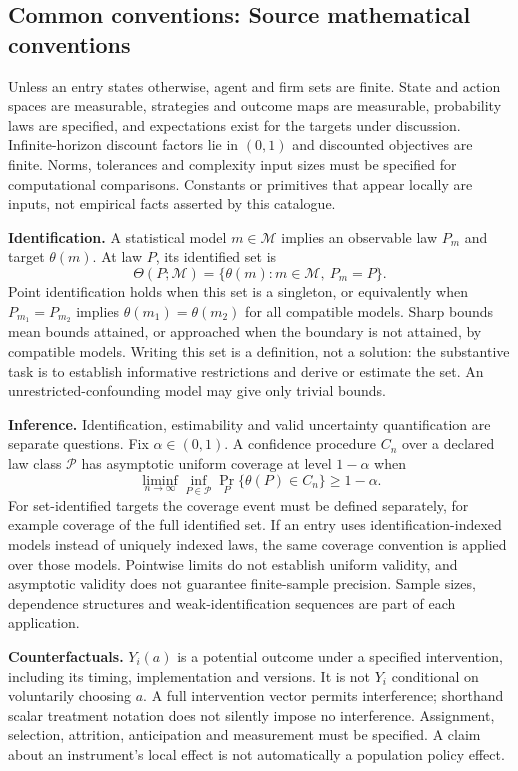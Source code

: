 \documentclass[11pt,a4paper]{article}
\begin{document}
\subsection*{Common conventions: Source mathematical conventions}

Unless an entry states otherwise, agent and firm sets are finite. State and action spaces are measurable, strategies and outcome maps are measurable, probability laws are specified, and expectations exist for the targets under discussion. Infinite-horizon discount factors lie in $(0,1)$ and discounted objectives are finite. Norms, tolerances and complexity input sizes must be specified for computational comparisons. Constants or primitives that appear locally are inputs, not empirical facts asserted by this catalogue.

\textbf{Identification.} A statistical model $m\in\mathcal M$ implies an observable law $P_m$ and target $\theta(m)$. At law $P$, its identified set is
\[
\Theta(P;\mathcal M)=\{\theta(m):m\in\mathcal M,\ P_m=P\}.
\]
Point identification holds when this set is a singleton, or equivalently when $P_{m_1}=P_{m_2}$ implies $\theta(m_1)=\theta(m_2)$ for all compatible models. Sharp bounds mean bounds attained, or approached when the boundary is not attained, by compatible models. Writing this set is a definition, not a solution: the substantive task is to establish informative restrictions and derive or estimate the set. An unrestricted-confounding model may give only trivial bounds.

\textbf{Inference.} Identification, estimability and valid uncertainty quantification are separate questions. Fix $\alpha\in(0,1)$. A confidence procedure $C_n$ over a declared law class $\mathcal P$ has asymptotic uniform coverage at level $1-\alpha$ when
\[
\liminf_{n\to\infty}\inf_{P\in\mathcal P}\Pr_P\{\theta(P)\in C_n\}\geq1-\alpha.
\]
For set-identified targets the coverage event must be defined separately, for example coverage of the full identified set. If an entry uses identification-indexed models instead of uniquely indexed laws, the same coverage convention is applied over those models. Pointwise limits do not establish uniform validity, and asymptotic validity does not guarantee finite-sample precision. Sample sizes, dependence structures and weak-identification sequences are part of each application.

\textbf{Counterfactuals.} $Y_i(a)$ is a potential outcome under a specified intervention, including its timing, implementation and versions. It is not $Y_i$ conditional on voluntarily choosing $a$. A full intervention vector permits interference; shorthand scalar treatment notation does not silently impose no interference. Assignment, selection, attrition, anticipation and measurement must be specified. A claim about an instrument's local effect is not automatically a population policy effect.
\end{document}
